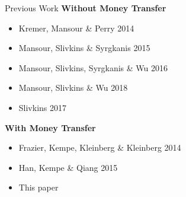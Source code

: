 \documentclass[serif]{beamer}
\begin{document}
\begin{frame}{Previous Work}
\textbf{Without Money Transfer}\\
\small{
\begin{itemize}
\item Kremer, Mansour \& Perry 2014
\item Mansour, Slivkins \& Syrgkanis 2015
\item Mansour, Slivkins, Syrgkanis \& Wu 2016
\item Mansour, Slivkins \& Wu 2018
\item Slivkins 2017
\end{itemize}
}
\vspace{0.5cm}
\textbf{With Money Transfer}\\
\small{
\begin{itemize}
\item Frazier, Kempe, Kleinberg \& Kleinberg 2014
\item Han, Kempe \& Qiang 2015
\item This paper
\end{itemize}
}
\end{frame}

\end{document}
